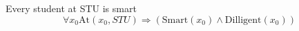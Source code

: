 \documentclass{article}
\begin{document}
Every student at STU is smart
$$
\forall
x_0
\text{
At
}
(
x_0
, 
STU
)
\Rightarrow
(
\text{
Smart
}
(
x_0
)
\wedge
\text{
Dilligent
}
(
x_0
)
)
$$
\end{document}
